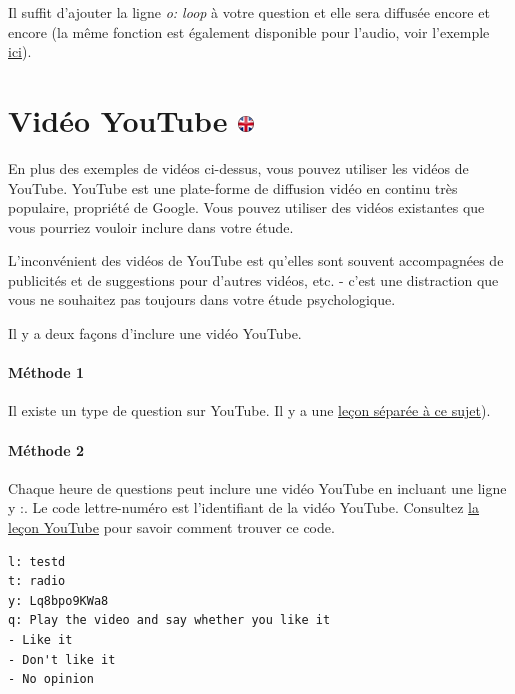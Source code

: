 \documentclass[
]{book}
\begin{document}
Il suffit d'ajouter la ligne \emph{o: loop} à votre question et elle sera diffusée encore et encore (la même fonction est également disponible pour l'audio, voir l'exemple \protect\hyperlink{how_to_play_a_sound_again_and_again_loop}{ici}).

\hypertarget{viduxe9o-youtube}{%
\section[Vidéo YouTube ]{\texorpdfstring{Vidéo YouTube \href{https://www.psytoolkit.org/lessons/surveyaudiovideo.html\#_youtube_video}{\protect\includegraphics{img/ukflag.png}}}{Vidéo YouTube }}\label{viduxe9o-youtube}}

En plus des exemples de vidéos ci-dessus, vous pouvez utiliser les vidéos de YouTube. YouTube est une plate-forme de diffusion vidéo en continu très populaire, propriété de Google. Vous pouvez utiliser des vidéos existantes que vous pourriez vouloir inclure dans votre étude.

L'inconvénient des vidéos de YouTube est qu'elles sont souvent accompagnées de publicités et de suggestions pour d'autres vidéos, etc. - c'est une distraction que vous ne souhaitez pas toujours dans votre étude psychologique.

Il y a deux façons d'inclure une vidéo YouTube.

\hypertarget{muxe9thode-1}{%
\paragraph{Méthode 1}\label{muxe9thode-1}}

Il existe un type de question sur YouTube. Il y a une \href{https://www.psytoolkit.org/lessons/youtube_video.html}{leçon séparée à ce sujet}).

\hypertarget{muxe9thode-2}{%
\paragraph{Méthode 2}\label{muxe9thode-2}}

Chaque heure de questions peut inclure une vidéo YouTube en incluant une ligne y :. Le code lettre-numéro est l'identifiant de la vidéo YouTube. Consultez \href{https://www.psytoolkit.org/lessons/youtube_video.html}{la leçon YouTube} pour savoir comment trouver ce code.

\begin{verbatim}
l: testd
t: radio
y: Lq8bpo9KWa8
q: Play the video and say whether you like it
- Like it
- Don't like it
- No opinion
\end{verbatim}
\end{document}
